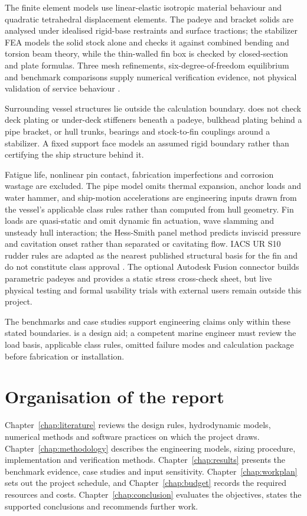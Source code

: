 The finite element models use linear-elastic isotropic material behaviour and quadratic tetrahedral displacement elements. The padeye and bracket solids are analysed under idealised rigid-base restraints and surface tractions; the stabilizer FEA models the solid stock alone and checks it against combined bending and torsion beam theory, while the thin-walled fin box is checked by closed-section and plate formulas. Three mesh refinements, six-degree-of-freedom equilibrium and benchmark comparisons supply numerical verification evidence, not physical validation of service behaviour \cite{asmeVV10}.

Surrounding vessel structures lie outside the calculation boundary. \NEMO{} does not check deck plating or under-deck stiffeners beneath a padeye, bulkhead plating behind a pipe bracket, or hull trunks, bearings and stock-to-fin couplings around a stabilizer. A fixed support face models an assumed rigid boundary rather than certifying the ship structure behind it.

Fatigue life, nonlinear pin contact, fabrication imperfections and corrosion wastage are excluded. The pipe model omits thermal expansion, anchor loads and water hammer, and ship-motion accelerations are engineering inputs drawn from the vessel's applicable class rules rather than computed from hull geometry. Fin loads are quasi-static and omit dynamic fin actuation, wave slamming and unsteady hull interaction; the Hess-Smith panel method predicts inviscid pressure and cavitation onset rather than separated or cavitating flow. IACS UR S10 rudder rules are adapted as the nearest published structural basis for the fin and do not constitute class approval \cite{iacsS10}. The optional Autodesk Fusion connector builds parametric padeyes and provides a static stress cross-check sheet, but live physical testing and formal usability trials with external users remain outside this project.

The benchmarks and case studies support engineering claims only within these stated boundaries. \NEMO{} is a design aid; a competent marine engineer must review the load basis, applicable class rules, omitted failure modes and calculation package before fabrication or installation.

\section{Organisation of the report}
\label{sec:report-organisation}

Chapter~\ref{chap:literature} reviews the design rules, hydrodynamic models, numerical methods and software practices on which the project draws. Chapter~\ref{chap:methodology} describes the engineering models, sizing procedure, implementation and verification methods. Chapter~\ref{chap:results} presents the benchmark evidence, case studies and input sensitivity. Chapter~\ref{chap:workplan} sets out the project schedule, and Chapter~\ref{chap:budget} records the required resources and costs. Chapter~\ref{chap:conclusion} evaluates the objectives, states the supported conclusions and recommends further work.

